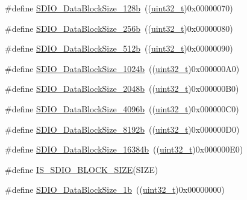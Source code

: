 \begin{DoxyCompactItemize}
\item 
\#define \hyperlink{group___s_d_i_o___data___block___size_gaba545c3a5e0f3296341d89a647cb9751}{S\+D\+I\+O\+\_\+\+Data\+Block\+Size\+\_\+128b}~((\hyperlink{_p_e___types_8h_a33594304e786b158f3fb30289278f5af}{uint32\+\_\+t})0x00000070)
\item 
\#define \hyperlink{group___s_d_i_o___data___block___size_gaa099d7706f98a4fa6eb88277dc6680cf}{S\+D\+I\+O\+\_\+\+Data\+Block\+Size\+\_\+256b}~((\hyperlink{_p_e___types_8h_a33594304e786b158f3fb30289278f5af}{uint32\+\_\+t})0x00000080)
\item 
\#define \hyperlink{group___s_d_i_o___data___block___size_gaa619848f7700962c5b7065f43e286e0b}{S\+D\+I\+O\+\_\+\+Data\+Block\+Size\+\_\+512b}~((\hyperlink{_p_e___types_8h_a33594304e786b158f3fb30289278f5af}{uint32\+\_\+t})0x00000090)
\item 
\#define \hyperlink{group___s_d_i_o___data___block___size_ga7dad3c1c33e63a00eb6301b0a1135baf}{S\+D\+I\+O\+\_\+\+Data\+Block\+Size\+\_\+1024b}~((\hyperlink{_p_e___types_8h_a33594304e786b158f3fb30289278f5af}{uint32\+\_\+t})0x000000\+A0)
\item 
\#define \hyperlink{group___s_d_i_o___data___block___size_ga41eb937621c7ffcf2688c6bc0ea31464}{S\+D\+I\+O\+\_\+\+Data\+Block\+Size\+\_\+2048b}~((\hyperlink{_p_e___types_8h_a33594304e786b158f3fb30289278f5af}{uint32\+\_\+t})0x000000\+B0)
\item 
\#define \hyperlink{group___s_d_i_o___data___block___size_ga360411488abdbaf9eee9b99fca793f79}{S\+D\+I\+O\+\_\+\+Data\+Block\+Size\+\_\+4096b}~((\hyperlink{_p_e___types_8h_a33594304e786b158f3fb30289278f5af}{uint32\+\_\+t})0x000000\+C0)
\item 
\#define \hyperlink{group___s_d_i_o___data___block___size_gaf61913f3eff52c0f728db9ffbdaca7d2}{S\+D\+I\+O\+\_\+\+Data\+Block\+Size\+\_\+8192b}~((\hyperlink{_p_e___types_8h_a33594304e786b158f3fb30289278f5af}{uint32\+\_\+t})0x000000\+D0)
\item 
\#define \hyperlink{group___s_d_i_o___data___block___size_gae80bc49dbed677f7087d523c31fe10ae}{S\+D\+I\+O\+\_\+\+Data\+Block\+Size\+\_\+16384b}~((\hyperlink{_p_e___types_8h_a33594304e786b158f3fb30289278f5af}{uint32\+\_\+t})0x000000\+E0)
\item 
\#define \hyperlink{group___s_d_i_o___data___block___size_ga25ce8d64134659c479d61aa681761948}{I\+S\+\_\+\+S\+D\+I\+O\+\_\+\+B\+L\+O\+C\+K\+\_\+\+S\+I\+ZE}(S\+I\+ZE)
\item 
\#define \hyperlink{group___s_d_i_o___data___block___size_gaa86e90ddc3426b242a5230b3360c620d}{S\+D\+I\+O\+\_\+\+Data\+Block\+Size\+\_\+1b}~((\hyperlink{_p_e___types_8h_a33594304e786b158f3fb30289278f5af}{uint32\+\_\+t})0x00000000)

\end{DoxyCompactItemize}
